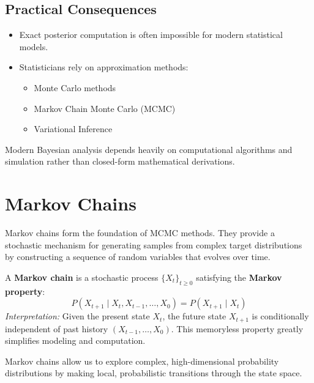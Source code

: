 \documentclass[12pt,a4paper]{article}
\begin{document}
\subsection{Practical Consequences}

\begin{itemize}[leftmargin=1.5em]
    \item Exact posterior computation is often impossible for modern statistical models.
    \item Statisticians rely on approximation methods:
    \begin{itemize}
        \item Monte Carlo methods
        \item Markov Chain Monte Carlo (MCMC)
        \item Variational Inference
    \end{itemize}
\end{itemize}

\begin{keyidea}
Modern Bayesian analysis depends heavily on computational algorithms and simulation rather than closed-form mathematical derivations.
\end{keyidea}

\newpage

\section{Markov Chains}

Markov chains form the foundation of MCMC methods. They provide a stochastic mechanism for generating samples from complex target distributions by constructing a sequence of random variables that evolves over time.

\begin{defbox}
A \textbf{Markov chain} is a stochastic process $\{X_t\}_{t \ge 0}$ satisfying the \textbf{Markov property}:
\[
P(X_{t+1} \mid X_t, X_{t-1}, \ldots, X_0) = P(X_{t+1} \mid X_t)
\]
\textit{Interpretation:} Given the present state $X_t$, the future state $X_{t+1}$ is conditionally independent of past history $(X_{t-1}, \ldots, X_0)$. This memoryless property greatly simplifies modeling and computation.
\end{defbox}

\begin{keyidea}
Markov chains allow us to explore complex, high-dimensional probability distributions by making local, probabilistic transitions through the state space.
\end{keyidea}
\end{document}
